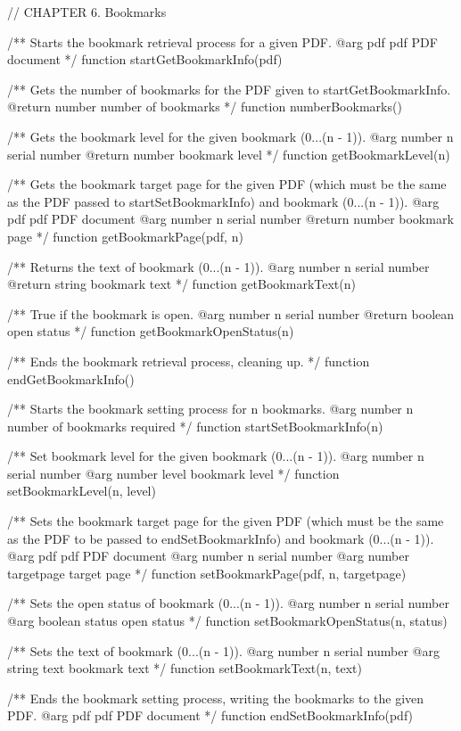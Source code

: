 // CHAPTER 6. Bookmarks

/** Starts the bookmark retrieval process for a given PDF.
@arg {pdf} pdf PDF document */
function startGetBookmarkInfo(pdf) {}

/** Gets the number of bookmarks for the PDF given to startGetBookmarkInfo.
@return {number} number of bookmarks */
function numberBookmarks() {}

/** Gets the bookmark level for the given bookmark (0...(n - 1)).
@arg {number} n serial number
@return {number} bookmark level */
function getBookmarkLevel(n) {}

/** Gets the bookmark target page for the given PDF (which must be the same
as the PDF passed to startSetBookmarkInfo) and bookmark (0...(n - 1)).
@arg {pdf} pdf PDF document
@arg {number} n serial number
@return {number} bookmark page */
function getBookmarkPage(pdf, n) {}

/** Returns the text of bookmark (0...(n - 1)).
@arg {number} n serial number
@return {string} bookmark text */
function getBookmarkText(n) {}

/** True if the bookmark is open.
@arg {number} n serial number
@return {boolean} open status */
function getBookmarkOpenStatus(n) {}

/** Ends the bookmark retrieval process, cleaning up. */
function endGetBookmarkInfo() {}

/** Starts the bookmark setting process for n bookmarks.
@arg {number} n number of bookmarks required */
function startSetBookmarkInfo(n) {}

/** Set bookmark level for the given bookmark (0...(n - 1)).
@arg {number} n serial number
@arg {number} level bookmark level */
function setBookmarkLevel(n, level) {}

/** Sets the bookmark target page for the given PDF (which must be the same as
the PDF to be passed to endSetBookmarkInfo) and bookmark (0...(n - 1)).
@arg {pdf} pdf PDF document
@arg {number} n serial number
@arg {number} targetpage target page */
function setBookmarkPage(pdf, n, targetpage) {}

/** Sets the open status of bookmark (0...(n - 1)).
@arg {number} n serial number
@arg {boolean} status open status */
function setBookmarkOpenStatus(n, status) {}

/** Sets the text of bookmark (0...(n - 1)).
@arg {number} n serial number
@arg {string} text bookmark text */
function setBookmarkText(n, text) {}

/** Ends the bookmark setting process, writing the bookmarks to the given
PDF.
@arg {pdf} pdf PDF document */
function endSetBookmarkInfo(pdf) {}

